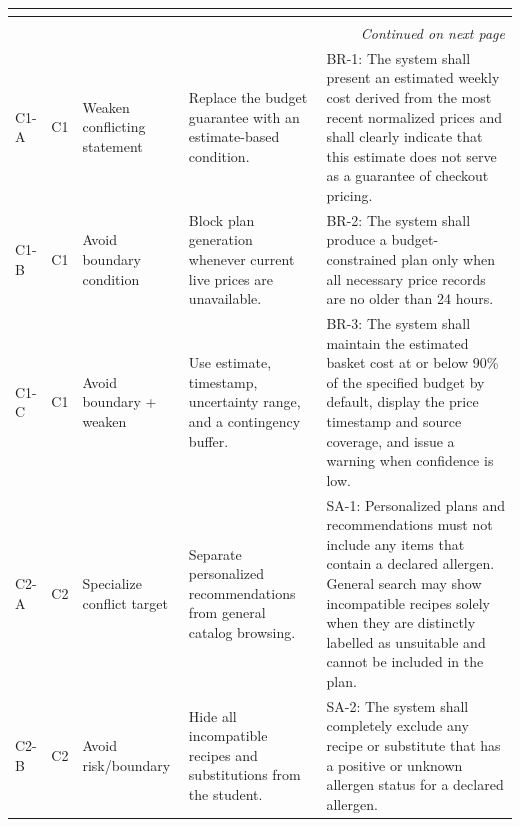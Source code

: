 \documentclass[11pt,a4paper]{article}
\renewcommand{\arraystretch}{1.15}
\begin{document}
\begin{landscape}
\begin{center}
\scriptsize
\setlength{\tabcolsep}{2.5pt}
\renewcommand{\arraystretch}{1.18}
\begin{longtable}{|p{1.2cm}|p{1.1cm}|p{3.8cm}|p{6.0cm}|p{12.0cm}|}
\hline
\rowcolor{headerblue} \textbf{\color{white}{Option}} & \textbf{\color{white}{Conflict}} & \textbf{\color{white}{Operator/tactic}} & \textbf{\color{white}{Resolution concept}} & \textbf{\color{white}{Candidate requirement}} \\ \hline
\endfirsthead
\hline
\rowcolor{headerblue} \textbf{\color{white}{Option}} & \textbf{\color{white}{Conflict}} & \textbf{\color{white}{Operator/tactic}} & \textbf{\color{white}{Resolution concept}} & \textbf{\color{white}{Candidate requirement}} \\ \hline
\endhead
\hline
\multicolumn{5}{r}{\small\itshape Continued on next page}\\
\endfoot
\hline
\endlastfoot
C1-A & C1 & Weaken conflicting statement & Replace the budget guarantee with an estimate-based condition. & BR-1: The system shall present an estimated weekly cost derived from the most recent normalized prices and shall clearly indicate that this estimate does not serve as a guarantee of checkout pricing. \\ \hline
C1-B & C1 & Avoid boundary condition & Block plan generation whenever current live prices are unavailable. & BR-2: The system shall produce a budget-constrained plan only when all necessary price records are no older than 24 hours. \\ \hline
C1-C & C1 & Avoid boundary + weaken & Use estimate, timestamp, uncertainty range, and a contingency buffer. & BR-3: The system shall maintain the estimated basket cost at or below 90\% of the specified budget by default, display the price timestamp and source coverage, and issue a warning when confidence is low. \\ \hline
C2-A & C2 & Specialize conflict target & Separate personalized recommendations from general catalog browsing. & SA-1: Personalized plans and recommendations must not include any items that contain a declared allergen. General search may show incompatible recipes solely when they are distinctly labelled as unsuitable and cannot be included in the plan. \\ \hline
C2-B & C2 & Avoid risk/boundary & Hide all incompatible recipes and substitutions from the student. & SA-2: The system shall completely exclude any recipe or substitute that has a positive or unknown allergen status for a declared allergen. \\ \hline

\end{longtable}
\end{center}
\end{landscape}
\end{document}
